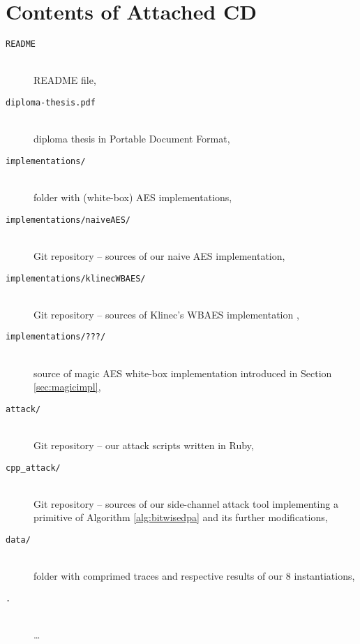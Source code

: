 \chapter{Contents of Attached CD}
\label{app:cd}
	
	\begin{description}
		\item[\tt README] ~ \\ README file,
		\item[\tt diploma-thesis.pdf] ~ \\ diploma thesis in Portable Document Format,
		\item[\tt implementations/] ~ \\ folder with (white-box) AES implementations,
		\item[\tt implementations/naiveAES/] ~ \\ Git repository -- sources of our naive AES implementation,
		\item[\tt implementations/klinecWBAES/] ~ \\ Git repository -- sources of Klinec's WBAES implementation \cite{klinec2013implementation},
		\item[\tt implementations/???/] ~ \\ source of magic AES white-box implementation introduced in Section \ref{sec:magicimpl},
		\item[\tt attack/] ~ \\ Git repository -- our attack scripts written in Ruby,
		\item[\tt cpp\_attack/] ~ \\ Git repository -- sources of our side-channel attack tool implementing a primitive of Algorithm \ref{alg:bitwisedpa} and its further modifications,
		\item[\tt data/] ~ \\ folder with comprimed traces and respective results of our $8$ instantiations,
		\item[\tt .] ~ \\ \ldots
	\end{description}
